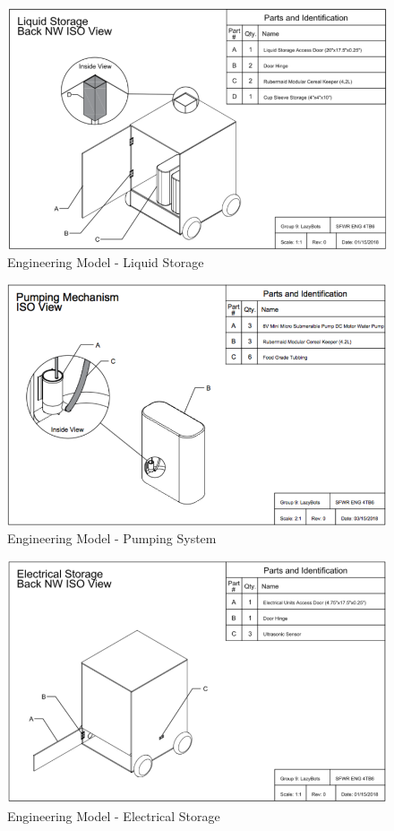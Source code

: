 \documentclass [10pt]{article}
\begin{document}
\begin{figure}[H]
	\centering
	\includegraphics [scale = 0.55] {figures/CAD_Liquid_Storage.png}
	\caption{Engineering Model - Liquid Storage}
\end{figure}

\begin{figure}[H]
	\centering
	\includegraphics [scale = 0.55] {figures/CAD_Pumping_System.png}
	\caption{Engineering Model - Pumping System}
\end{figure}
	
\begin{figure}[H]
	\centering
	\includegraphics [scale = 0.55] {figures/CAD_Electrical_Storage.png}
	\caption{Engineering Model - Electrical Storage}
\end{figure}
	
\end{document}
